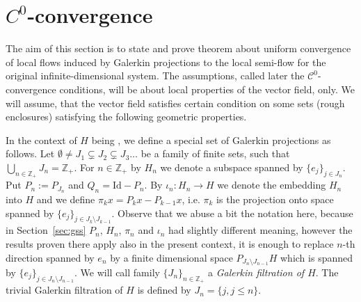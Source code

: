 \section{$C^0$-convergence}
\label{sec:c0-conver}


The aim of this section is to state and prove theorem about uniform convergence of local flows induced by Galerkin projections to the local semi-flow for the original infinite-dimensional system. The assumptions, called later the $\mathcal C^0$-convergence conditions, will be about local properties of the vector field, only. We will assume, that the vector field satisfies certain condition on some sets (rough enclosures) satisfying the following geometric properties.


In the context of $H$ being \gss, we define a special set of Galerkin projections as follows.
Let $\emptyset\neq J_1  \subsetneq  J_2  \subsetneq J_3 \dots  $ be a family of finite sets, such that $\bigcup_{n \in \mathbb{Z}_+} J_n = \mathbb Z_+$.
For $n \in \mathbb{Z}_+$  by $H_n$ we denote a subspace spanned by
$\{e_j\}_{j \in J_n}$. Put $P_n:=P_{J_n}$ and $Q_n=\mathrm{Id}-P_n$. By $\iota_n:H_n \to H$ we denote the embedding $H_n$ into $H$ and we define $\pi_k x = P_k x - P_{k-1}x$, i.e.
$\pi_k$ is the projection onto space spanned by $\{e_j\}_{j \in J_k \setminus J_{k-1}}$.
Observe that we abuse a bit the notation here, because in Section~\ref{sec:gss} $P_n$, $H_n$, $\pi_n$ and $\iota_n$ had slightly different meaning, however the results proven there apply also in the present context, it is enough to replace $n$-th direction spanned by $e_n$ by a finite dimensional space $P_{J_n\setminus J_{n-1}}H$ which is spanned
by $\{e_j\}_{j \in J_n \setminus J_{n-1}}$. We will call family $\{J_n\}_{n \in \mathbb{Z}_+}$ a \emph{Galerkin filtration of $H$}.  The trivial Galerkin filtration of $H$ is defined by
$J_n=\{j , j \leq n\}$. 



